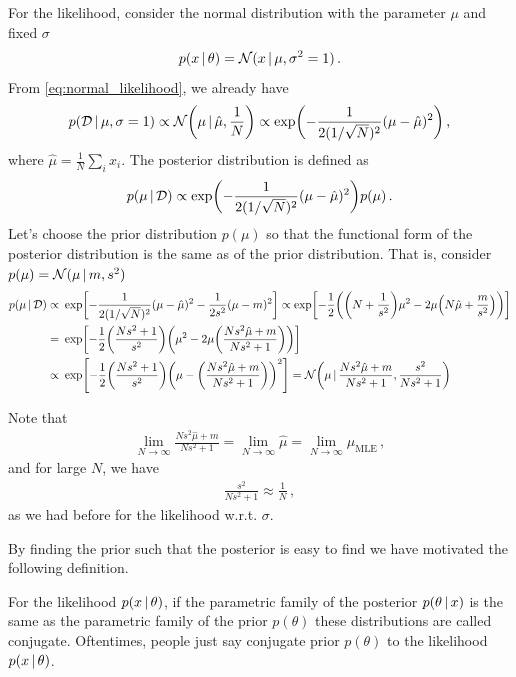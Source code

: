 \begin{example}
    For the likelihood, consider the normal distribution with the parameter $\mu$ and fixed $\sigma$
    \begin{align}
        p(x\,|\, \theta) = \mathcal{N}(x\,|\, \mu,\sigma^2=1)\,.
    \end{align}
    From \cref{eq:normal_likelihood}, we already have
    \begin{align}
        p(\mathcal{D}\cond \mu, \sigma=1)\propto\Normal\left(\mu\cond \hat{\mu},\frac{1}{N}\right) \propto \exp\left(-\frac{1}{2(1/\sqrt{N})^2}(\mu-\hat{\mu})^2\right)\,,
    \end{align}
    where $\hat{\mu} = \frac{1}{N}\sum_i x_i$.
    The posterior distribution is defined as
    \begin{align}
        p(\mu \cond \mathcal{D}) \propto \exp\left(-\frac{1}{2(1/\sqrt{N})^2}(\mu-\hat{\mu})^2\right)p(\mu)\,.
    \end{align}
    Let's choose the prior distribution $p(\mu)$ so that the functional form of the posterior distribution is the same as of the prior distribution.
    That is, consider $p(\mu) = \mathcal{N}(\mu\,|\, m,s^2)$
    \begin{align}
        p(\mu \cond \mathcal{D}) \propto~& \exp\left[-\frac{1}{2(1/\sqrt{N})^2}(\mu-\hat{\mu})^2-\frac{1}{2s^2}(\mu-m)^2\right] \propto \exp\left[-\frac{1}{2}\left(\left(N+\frac{1}{s^2}\right)\mu^2 -2\mu\left(N\hat{\mu}+\frac{m}{s^2}\right)\right)\right] \\
        =~& \exp\left[-\frac{1}{2}\left(\frac{Ns^2+1}{s^2}\right)\left(\mu^2 -2\mu\left(\frac{Ns^2\hat{\mu}+m}{Ns^2+1}\right)\right)\right] \\
        \propto~& \exp\left[-\frac{1}{2}\left(\frac{Ns^2+1}{s^2}\right)\left(\mu -\left(\frac{Ns^2\hat{\mu}+m}{Ns^2+1}\right)\right)^2\right] = \Normal\left(\mu\cond \frac{Ns^2\hat{\mu}+m}{Ns^2+1}, \frac{s^2}{Ns^2+1}\right)
    \end{align}
\end{example}
Note that
\begin{align}
    \lim_{N\to\infty} \frac{Ns^2\hat{\mu}+m}{Ns^2+1} = \lim_{N\to\infty}\hat{\mu} = \lim_{N\to\infty}\mu_{\text{MLE}}\,,
\end{align}
and for large $N$, we have
\begin{align}
    \frac{s^2}{Ns^2+1} \approx \frac{1}{N}\,,
\end{align}
as we had before for the likelihood w.r.t. $\sigma$.

By finding the prior such that the posterior is easy to find we have motivated the following definition.
\begin{mybox}
\begin{definition}\label{def:conjugate_dist}
    For the likelihood $p(x\,|\, \theta)$, if the parametric family of the posterior $p(\theta\,|\, x)$ is the same as the parametric family of the prior $p(\theta)$ these distributions are called conjugate.
    Oftentimes, people just say conjugate prior $p(\theta)$ to the likelihood $p(x\,|\, \theta)$.
\end{definition}
\end{mybox}

